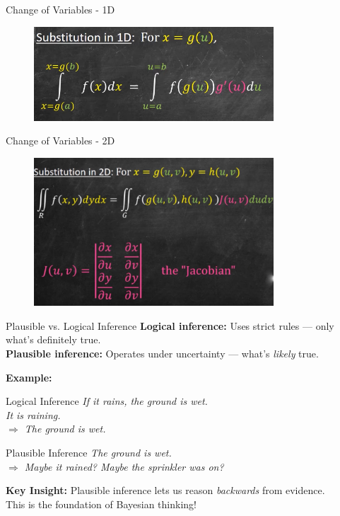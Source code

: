 \documentclass[handout,aspectratio=169]{beamer}
\begin{document}
\begin{frame}{Change of Variables - 1D}
  \begin{figure}[htbp]
		\centering
		\includegraphics[width=0.8\textwidth]{figs/1d.png}
	\end{figure}
  
\end{frame}

\begin{frame}{Change of Variables - 2D}
  \begin{figure}[htbp]
		\centering
		\includegraphics[width=0.8\textwidth]{figs/2d.png}
	\end{figure}
  
\end{frame}

\begin{frame}{Plausible vs. Logical Inference}
  \textbf{Logical inference:} Uses strict rules — only what’s definitely true.\\
  \textbf{Plausible inference:} Operates under uncertainty — what's \textit{likely} true.

  \vspace{1em}
  \textbf{Example:}
  \begin{block}{Logical Inference}
    \textit{If it rains, the ground is wet.\\
    It is raining.\\
    $\Rightarrow$ The ground is wet.}
  \end{block}

  \begin{block}{Plausible Inference}
    \textit{The ground is wet.\\
    $\Rightarrow$ Maybe it rained? Maybe the sprinkler was on?}
  \end{block}

  \vspace{1em}
  \textbf{Key Insight:} Plausible inference lets us reason \textit{backwards} from evidence.\\
  This is the foundation of Bayesian thinking!
\end{frame}
\end{document}
